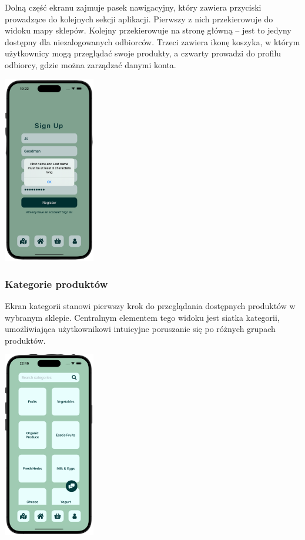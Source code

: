 Dolną część ekranu zajmuje pasek nawigacyjny, który zawiera przyciski prowadzące do kolejnych sekcji aplikacji. Pierwszy z nich przekierowuje do widoku mapy sklepów. Kolejny przekierowuje na stronę główną – jest to jedyny dostępny dla niezalogowanych odbiorców. Trzeci zawiera ikonę koszyka, w którym użytkownicy mogą przeglądać swoje produkty, a czwarty prowadzi do profilu odbiorcy, gdzie można zarządzać danymi konta.

\begin{center} 
    \includegraphics[width=0.3\textwidth]{images/front/register_invalid.png}
\end{center}

\subsubsection{Kategorie produktów}

Ekran kategorii stanowi pierwszy krok do przeglądania dostępnych produktów w wybranym sklepie. Centralnym elementem tego widoku jest siatka kategorii, umożliwiająca użytkownikowi intuicyjne poruszanie się po różnych grupach produktów. 

\begin{center} 
    \includegraphics[width=0.3\textwidth]{images/front/categories_page.png} 
\end{center}

